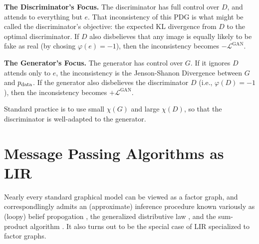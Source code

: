 \textbf{The Discriminator's Focus.}
The discriminator has full control over $D$, and attends to
everything but $e$.
That inconsistency of this PDG is what might be called
the discriminator's objective:
the expected KL divergence from $D$ to the optimal discriminator.
If $D$ also disbelieves that any image is equally likely to be fake as real
(by chosing $\varphi(e) = -1$),
then the inconsistency becomes $-\mathcal L^{\text{GAN}}$.

\textbf{The Generator's Focus.}
The generator has control over $G$.
If it ignores $D$ attends only to $e$, the inconsistency
is the Jenson-Shanon Divergence between $G$ and $p_{\mathrm{data}}$.
If the generator also disbelieves the discriminator $D$
(i.e., $ \varphi(D) =-1$),
then the inconsistency becomes $+\mathcal L^{\text{GAN}}$.

Standard practice is to use small $\chi(G)$ and large $\chi(D)$,
so that the discriminator is well-adapted to the generator.

\section{Message Passing Algorithms as LIR}

Nearly every standard graphical model can be viewed
    as a factor graph, and correspondlingly admits an
    (approximate) inference procedure known
    variously as (loopy) belief propogation \cite{koller2009probabilistic},
    the generalized distributive law \cite{aji2000gendistriblaw},
    and the sum-product algorithm \cite{kschischang2001factor}.
It also turns out to be the special case of LIR specialized to factor graphs.

